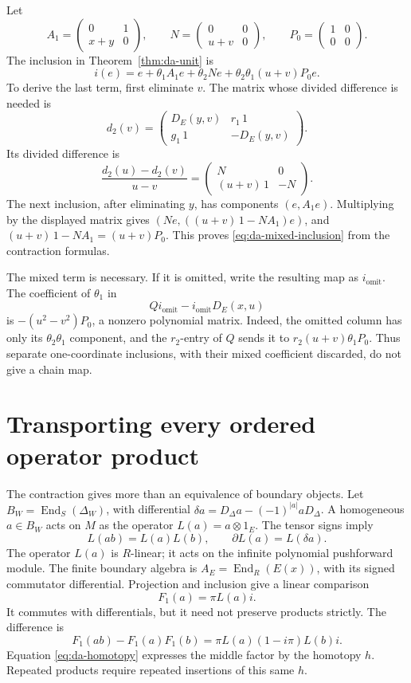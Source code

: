 Let
\[
 A_1=\begin{pmatrix}0&1\\x+y&0\end{pmatrix},\qquad
 N=\begin{pmatrix}0&0\\u+v&0\end{pmatrix},\qquad
 P_0=\begin{pmatrix}1&0\\0&0\end{pmatrix}.
\]
The inclusion in Theorem~\ref{thm:da-unit} is
\begin{equation}
 i(e)=e+\theta_1A_1e+\theta_2Ne
                +\theta_2\theta_1(u+v)P_0e .
 \label{eq:da-mixed-inclusion}
\end{equation}
To derive the last term, first eliminate \(v\).
The matrix whose divided difference is needed is
\[
 d_2(v)=
 \begin{pmatrix}D_E(y,v)&r_1\,1\\g_1\,1&-D_E(y,v)\end{pmatrix}.
\]
Its divided difference is
\[
 \frac{d_2(u)-d_2(v)}{u-v}
   =\begin{pmatrix}N&0\\(u+v)\,1&-N\end{pmatrix}.
\]
The next inclusion, after eliminating \(y\), has components
\((e,A_1e)\). Multiplying by the displayed matrix gives
\((Ne,((u+v)\,1-NA_1)e)\), and
\((u+v)\,1-NA_1=(u+v)P_0\). This proves
\eqref{eq:da-mixed-inclusion} from the contraction formulas.

The mixed term is necessary. If it is omitted, write the resulting
map as \(i_{\mathrm{omit}}\). The coefficient of \(\theta_1\) in
\[
 Qi_{\mathrm{omit}}-i_{\mathrm{omit}}D_E(x,u)
\]
is \(-(u^2-v^2)P_0\), a nonzero polynomial matrix.
Indeed, the omitted column has only its
\(\theta_2\theta_1\) component, and the \(r_2\)-entry of \(Q\)
sends it to \(r_2(u+v)\theta_1P_0\).
Thus separate one-coordinate inclusions, with their mixed
coefficient discarded, do not give a chain map.

\section{Transporting every ordered operator product}
\label{sec:da-boundary-operators}

The contraction gives more than an equivalence of boundary objects.
Let \(B_W=\operatorname{End}_S(\Delta_W)\), with differential
\(\delta a=D_\Delta a-(-1)^{|a|}aD_\Delta\).
A homogeneous \(a\in B_W\) acts on \(M\) as
the operator \(L(a)=a\otimes1_E\).
The tensor signs imply
\[
 L(ab)=L(a)L(b),\qquad
 \partial L(a)=L(\delta a).
\]
The operator \(L(a)\) is \(R\)-linear; it acts on the infinite
polynomial pushforward module. The finite boundary algebra is
\(A_E=\operatorname{End}_R(E(x))\), with its signed commutator
differential. Projection and inclusion give a linear comparison
\[
 F_1(a)=\pi L(a)i.
\]
It commutes with differentials, but it need not preserve products
strictly. The difference is
\[
 F_1(ab)-F_1(a)F_1(b)
   =\pi L(a)(1-i\pi)L(b)i.
\]
Equation \eqref{eq:da-homotopy} expresses the middle factor by
the homotopy \(h\). Repeated products require repeated insertions
of this same \(h\).


